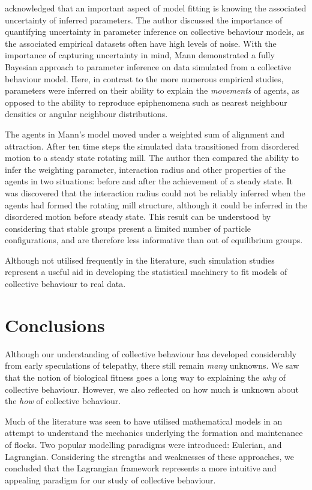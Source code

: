 \textcite{mann11} acknowledged that an important aspect of model fitting is
knowing the associated uncertainty of inferred parameters. The author discussed
the importance of quantifying uncertainty in parameter inference on collective
behaviour models, as the associated empirical datasets often have high levels
of noise. With the importance of capturing uncertainty in mind, Mann
demonstrated a fully Bayesian approach to parameter inference on data simulated
from a collective behaviour model. Here, in contrast to the more numerous
empirical studies, parameters were inferred on their ability to explain the
\emph{movements} of agents, as opposed to the ability to reproduce epiphenomena
such as nearest neighbour densities or angular neighbour distributions.

The agents in Mann's model moved under a weighted sum of alignment and
attraction. After ten time steps the simulated data transitioned from
disordered motion to a steady state rotating mill. The author then compared the
ability to infer the weighting parameter, interaction radius and other
properties of the agents in two situations: before and after the achievement of
a steady state. It was discovered that the interaction radius could not be
reliably inferred when the agents had formed the rotating mill structure,
although it could be inferred in the disordered motion before steady state.
This result can be understood by considering that stable groups present a
limited number of particle configurations, and are therefore less informative
than out of equilibrium groups.

Although not utilised frequently in the literature, such simulation studies
represent a useful aid in developing the statistical machinery to fit models of
collective behaviour to real data.

\section*{Conclusions}

Although our understanding of collective behaviour has developed considerably
from early speculations of telepathy, there still remain \emph{many} unknowns.
We saw that the notion of biological fitness goes a long way to explaining the
\emph{why} of collective behaviour. However, we also reflected on how much is
unknown about the \emph{how} of collective behaviour.

Much of the literature was seen to have utilised mathematical models in an
attempt to understand the mechanics underlying the formation and maintenance of
flocks. Two popular modelling paradigms were introduced: Eulerian, and
Lagrangian. Considering the strengths and weaknesses of these approaches, we
concluded that the Lagrangian framework represents a more intuitive and
appealing paradigm for our study of collective behaviour.

